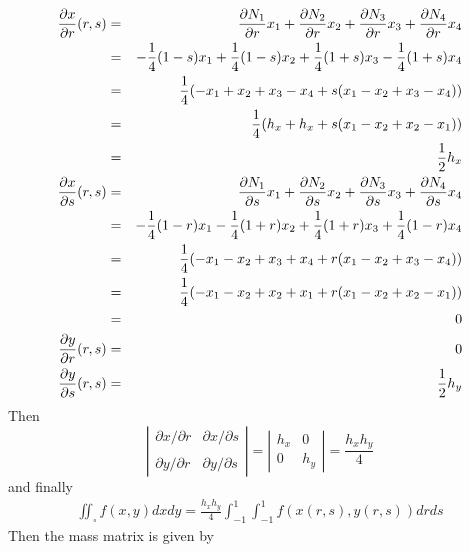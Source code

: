 \begin{eqnarray}
\frac{\partial x}{\partial r}(r,s)
&=&\frac{\partial N_1}{\partial r} x_1+\frac{\partial N_2}{\partial r} x_2
+\frac{\partial N_3}{\partial r} x_3+\frac{\partial N_4}{\partial r} x_4 \nonumber\\
&=& -\frac{1}{4}(1-s) x_1 + \frac{1}{4}(1-s) x_2 + \frac{1}{4}(1+s) x_3 - \frac{1}{4}(1+s) x_4 \nonumber\\
&=& \frac{1}{4} ( -x_1 +x_2 +x_3 -x_4  +s (x_1 -x_2 +x_3 -x_4)   )  \nonumber\\
&=& \frac{1}{4} ( h_x+h_x  +s (x_1 -x_2 +x_2 -x_1)   )  \nonumber\\
&=& \frac{1}{2} h_x \nonumber\\
\frac{\partial x}{\partial s}(r,s)
&=&\frac{\partial N_1}{\partial s} x_1+\frac{\partial N_2}{\partial s} x_2
+\frac{\partial N_3}{\partial s} x_3+\frac{\partial N_4}{\partial s} x_4 \nonumber\\
&=& -\frac{1}{4}(1-r)x_1 - \frac{1}{4}(1+r)x_2 +\frac{1}{4}(1+r)x_3 +\frac{1}{4}(1-r)x_4 \nonumber\\
&=& \frac{1}{4} ( -x_1 -x_2 +x_3+x_4 + r(x_1-x_2+x_3-x_4) ) \nonumber\\ 
&=& \frac{1}{4} ( -x_1 -x_2 +x_2+x_1 + r(x_1-x_2+x_2-x_1) ) \nonumber\\
&=& 0 \nonumber\\ 
\frac{\partial y}{\partial r}(r,s)
&=& 0 \nonumber\\
\frac{\partial y}{\partial s}(r,s)
&=& \frac{1}{2} h_y
\end{eqnarray}
Then 
\[
\left| 
\begin{array}{cc}
\partial x/\partial r & \partial x/\partial s \\ \\
\partial y/\partial r & \partial y/\partial s 
\end{array}
\right|  
=
\left| 
\begin{array}{cc}
h_x & 0 \\
0 & h_y 
\end{array}
\right|  
= \frac{h_xh_y}{4}
\]
and finally  
\begin{eqnarray}
\boxed{
\iint_\square f(x,y) dx dy =  \frac{h_xh_y}{4} \int_{-1}^{1} \int_{-1}^{1} f(x(r,s),y(r,s)) dr ds
}
\end{eqnarray}
Then the mass matrix is given by

